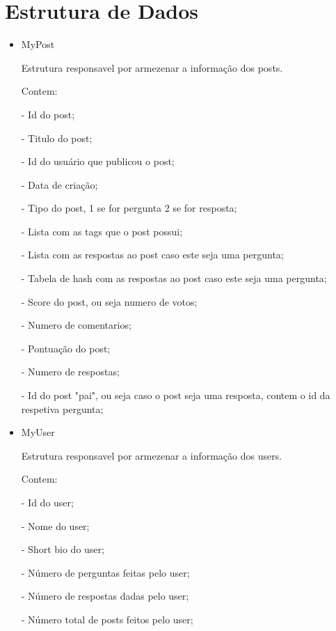 \documentclass[a4paper,10pt]{article}
\begin{document}
\section{Estrutura de Dados}
  \begin{itemize}
  \item MyPost
  
  \quad Estrutura responsavel por armezenar a informa\c{c}\~{a}o dos posts.
  
  \quad Contem: 
    
    \quad \quad - Id do post;
    
    \quad \quad - Titulo do post;
    
    \quad \quad - Id do usu\'{a}rio que publicou o post;
    
    \quad \quad - Data de cria\c{c}\~{a}o;

    \quad \quad - Tipo do post, 1 se for pergunta 2 se for resposta;
  
    \quad \quad - Lista com as tags que o post possui;

    \quad \quad - Lista com as respostas ao post caso este seja uma pergunta;

    \quad \quad - Tabela de hash com as respostas ao post caso este seja uma pergunta;

    \quad \quad - Score do post, ou seja numero de votos;

    \quad \quad - Numero de comentarios;

    \quad \quad - Pontua\c{c}\~{a}o do post;

    \quad \quad - Numero de respostas;

    \quad \quad - Id do post "pai", ou seja caso o post seja uma resposta, contem o id da respetiva pergunta;

    \item MyUser
  
  \quad Estrutura responsavel por armezenar a informa\c{c}\~{a}o dos users.
  
  \quad Contem: 
    
    \quad \quad - Id do user;
    
    \quad \quad - Nome do user;
    
    \quad \quad - Short bio do user;
    
    \quad \quad - N\'{u}mero de perguntas feitas pelo user;

    \quad \quad - N\'{u}mero de respostas dadas pelo user;
  
    \quad \quad - N\'{u}mero total de posts feitos pelo user;


\end{itemize}
\end{document}
